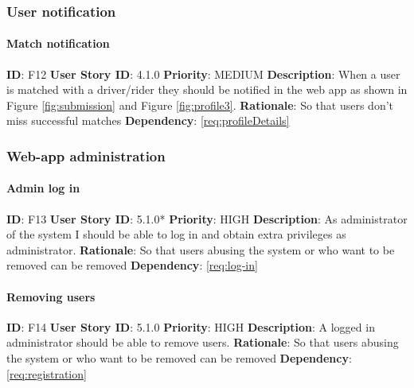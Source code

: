 \documentclass{article}
\begin{document}
\subsubsection{User notification}

\paragraph{Match notification}\label{req:matchNotification}
\textbf{ID}: F12\newline
\textbf{User Story ID}: 4.1.0\newline
\textbf{Priority}: MEDIUM\newline
\textbf{Description}: When a user is matched with a driver/rider they should be notified in the web app as shown in Figure \ref{fig:submission} and Figure \ref{fig:profile3}. \newline
\textbf{Rationale}: So that users don't miss successful matches\newline
\textbf{Dependency}: \ref{req:profileDetails}\newline

\subsubsection{Web-app administration}

\paragraph{Admin log in}\label{req:adminLog-in}
\textbf{ID}: F13\newline
\textbf{User Story ID}: 5.1.0*\newline
\textbf{Priority}: HIGH\newline
\textbf{Description}: As administrator of the system I should be able to log in and obtain extra privileges as administrator. \newline
\textbf{Rationale}: So that users abusing the system or who want to be removed can be removed\newline
\textbf{Dependency}: \ref{req:log-in}\newline

\paragraph{Removing users}\label{req:removingUser}
\textbf{ID}: F14\newline
\textbf{User Story ID}: 5.1.0\newline
\textbf{Priority}: HIGH\newline
\textbf{Description}: A logged in administrator should be able to remove users. \newline
\textbf{Rationale}: So that users abusing the system or who want to be removed can be removed\newline
\textbf{Dependency}: \ref{req:registration}\newline
\end{document}
